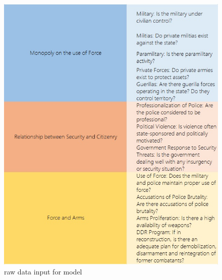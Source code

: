 \documentclass[a4paper,12pt]{article}
\begin{document}
\begin{figure} [H]
\centering

\includegraphics[width=\textwidth]{output2.jpg}
\caption{raw data input for model}
\end{figure}
\label{fig6}
\end{document}
